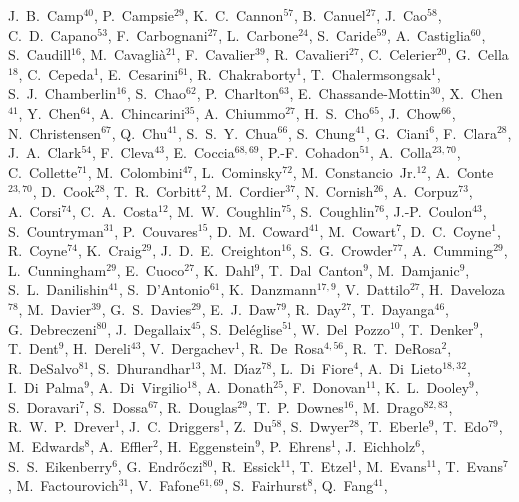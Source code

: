 \documentclass[12pt]{iopart}
\begin{document}
{J.~B.~Camp$^{40}$, 
P.~Campsie$^{29}$, 
K.~C.~Cannon$^{57}$, 
B.~Canuel$^{27}$, 
J.~Cao$^{58}$, 
C.~D.~Capano$^{53}$, 
F.~Carbognani$^{27}$, 
L.~Carbone$^{24}$, 
S.~Caride$^{59}$, 
A.~Castiglia$^{60}$, 
S.~Caudill$^{16}$, 
M.~Cavagli\`a$^{21}$, 
F.~Cavalier$^{39}$, 
R.~Cavalieri$^{27}$, 
C.~Celerier$^{20}$, 
G.~Cella$^{18}$, 
C.~Cepeda$^{1}$, 
E.~Cesarini$^{61}$, 
R.~Chakraborty$^{1}$, 
T.~Chalermsongsak$^{1}$, 
S.~J.~Chamberlin$^{16}$, 
S.~Chao$^{62}$, 
P.~Charlton$^{63}$, 
E.~Chassande-Mottin$^{30}$, 
X.~Chen$^{41}$, 
Y.~Chen$^{64}$, 
A.~Chincarini$^{35}$, 
A.~Chiummo$^{27}$, 
H.~S.~Cho$^{65}$, 
J.~Chow$^{66}$, 
N.~Christensen$^{67}$, 
Q.~Chu$^{41}$, 
S.~S.~Y.~Chua$^{66}$, 
S.~Chung$^{41}$, 
G.~Ciani$^{6}$, 
F.~Clara$^{28}$, 
J.~A.~Clark$^{54}$, 
F.~Cleva$^{43}$, 
E.~Coccia$^{68,69}$, 
P.-F.~Cohadon$^{51}$, 
A.~Colla$^{23,70}$, 
C.~Collette$^{71}$, 
M.~Colombini$^{47}$, 
L.~Cominsky$^{72}$, 
M.~Constancio~Jr.$^{12}$, 
A.~Conte$^{23,70}$, 
D.~Cook$^{28}$, 
T.~R.~Corbitt$^{2}$, 
M.~Cordier$^{37}$, 
N.~Cornish$^{26}$, 
A.~Corpuz$^{73}$, 
A.~Corsi$^{74}$, 
C.~A.~Costa$^{12}$, 
M.~W.~Coughlin$^{75}$, 
S.~Coughlin$^{76}$, 
J.-P.~Coulon$^{43}$, 
S.~Countryman$^{31}$, 
P.~Couvares$^{15}$, 
D.~M.~Coward$^{41}$, 
M.~Cowart$^{7}$, 
D.~C.~Coyne$^{1}$, 
R.~Coyne$^{74}$, 
K.~Craig$^{29}$, 
J.~D.~E.~Creighton$^{16}$, 
S.~G.~Crowder$^{77}$, 
A.~Cumming$^{29}$, 
L.~Cunningham$^{29}$, 
E.~Cuoco$^{27}$, 
K.~Dahl$^{9}$, 
T.~Dal~Canton$^{9}$, 
M.~Damjanic$^{9}$, 
S.~L.~Danilishin$^{41}$, 
S.~D'Antonio$^{61}$, 
K.~Danzmann$^{17,9}$, 
V.~Dattilo$^{27}$, 
H.~Daveloza$^{78}$, 
M.~Davier$^{39}$, 
G.~S.~Davies$^{29}$, 
E.~J.~Daw$^{79}$, 
R.~Day$^{27}$, 
T.~Dayanga$^{46}$, 
G.~Debreczeni$^{80}$, 
J.~Degallaix$^{45}$, 
S.~Del\'eglise$^{51}$, 
W.~Del~Pozzo$^{10}$, 
T.~Denker$^{9}$, 
T.~Dent$^{9}$, 
H.~Dereli$^{43}$, 
V.~Dergachev$^{1}$, 
R.~De~Rosa$^{4,56}$, 
R.~T.~DeRosa$^{2}$, 
R.~DeSalvo$^{81}$, 
S.~Dhurandhar$^{13}$, 
M.~D\'{\i}az$^{78}$, 
L.~Di~Fiore$^{4}$, 
A.~Di~Lieto$^{18,32}$, 
I.~Di~Palma$^{9}$, 
A.~Di~Virgilio$^{18}$, 
A.~Donath$^{25}$, 
F.~Donovan$^{11}$, 
K.~L.~Dooley$^{9}$, 
S.~Doravari$^{7}$, 
S.~Dossa$^{67}$, 
R.~Douglas$^{29}$, 
T.~P.~Downes$^{16}$, 
M.~Drago$^{82,83}$, 
R.~W.~P.~Drever$^{1}$, 
J.~C.~Driggers$^{1}$, 
Z.~Du$^{58}$, 
S.~Dwyer$^{28}$, 
T.~Eberle$^{9}$, 
T.~Edo$^{79}$, 
M.~Edwards$^{8}$, 
A.~Effler$^{2}$, 
H.~Eggenstein$^{9}$, 
P.~Ehrens$^{1}$, 
J.~Eichholz$^{6}$, 
S.~S.~Eikenberry$^{6}$, 
G.~Endr\H{o}czi$^{80}$, 
R.~Essick$^{11}$, 
T.~Etzel$^{1}$, 
M.~Evans$^{11}$, 
T.~Evans$^{7}$, 
M.~Factourovich$^{31}$, 
V.~Fafone$^{61,69}$, 
S.~Fairhurst$^{8}$, 
Q.~Fang$^{41}$, 
}
\end{document}
